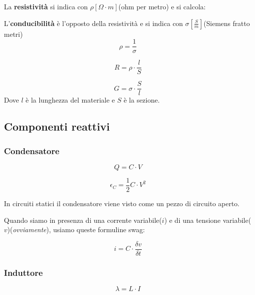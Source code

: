 La \textbf{resistività} si indica con $\rho [\Omega \cdot m]$(ohm per metro) e si calcola:



L'\textbf{conducibilità} è l'opposto della resistività e si indica con $\sigma [\frac{S}{m}]$(Siemens fratto metri)
\begin{equation*}
    \rho = \frac{1}{\sigma}
\end{equation*}

\begin{equation*}
    R = \rho \cdot \frac{l}{S}
\end{equation*}

\begin{equation*}
    G = \sigma \cdot \frac{S}{l}
\end{equation*}
Dove $l$ è la lunghezza del materiale e $S$ è la sezione.

\subsection{Componenti reattivi}
\subsubsection{Condensatore}

\begin{equation*}
    Q = C \cdot V
\end{equation*}

\begin{equation*}
    \epsilon_C = \frac{1}{2} C\cdot V^2
\end{equation*}


In circuiti statici il condensatore viene visto come un pezzo di circuito aperto.

Quando siamo in presenza di una corrente variabile($i$) e di una tensione variabile($v$)(\textit{ovviamente}), usiamo queste formuline swag:

\begin{equation*}
    i = C \cdot \frac{\delta v}{\delta t}
\end{equation*}

\subsubsection{Induttore}

\begin{equation*}
    \lambda = L \cdot I
\end{equation*}

